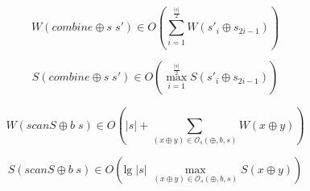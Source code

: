 \documentclass[a4paper,10pt]{article}
\begin{document}
\begin{equation*}
    W \left( combine \oplus s \; s' \right) \in
    O \left( \sum_{i=1}^{\frac{\vert s \vert}{2}} W \left( s'_{i} \oplus s_{2i-1} \right) \right)
\end{equation*}

\begin{equation*}
    S \left( combine \oplus s \; s' \right) \in
    O \left( \max_{i=1}^{\frac{\vert s \vert}{2}} S \left( s'_{i} \oplus s_{2i-1} \right) \right)
\end{equation*}

\begin{equation*}
    W \left( scanS \oplus b \; s \right) \in
    O \left( \vert s \vert + \sum_{(x \oplus y) \in \mathcal{O}_s(\oplus,b,s)} W \left( x \oplus y \right) \right)
\end{equation*}

\begin{equation*}
    S \left( scanS \oplus b \; s \right) \in
    O \left( \text{lg} \; \vert s \vert \; \max_{(x \oplus y) \in \mathcal{O}_s(\oplus,b,s)} S \left( x \oplus y \right) \right)
\end{equation*}
\end{document}
